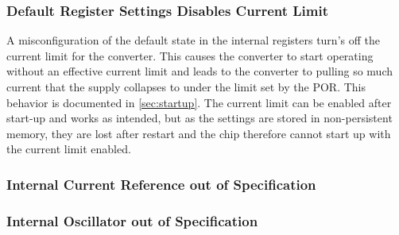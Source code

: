 \subsubsection{Default Register Settings Disables Current Limit}
\label{sec:missingcurrentlimit}

A misconfiguration of the default state in the internal registers turn's off the current limit for the converter. This causes the converter to start operating without an effective current limit and leads to the converter to pulling so much current that the supply collapses to under the limit set by the \ac{POR}. This behavior is documented in \autoref{sec:startup}. The current limit can be enabled after start-up and works as intended, but as the settings are stored in non-persistent memory, they are lost after restart and the chip therefore cannot start up with the current limit enabled. 


\subsubsection{Internal Current Reference out of Specification}

\subsubsection{Internal Oscillator out of Specification}